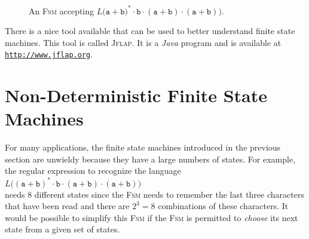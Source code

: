  \begin{figure}[!ht]
   \centering
    \caption{An \textsc{Fsm} accepting
             $L\bigl(\texttt{a}+\texttt{b})^* \cdot \texttt{b} \cdot (\texttt{a}+\texttt{b}) \cdot (\texttt{a}+\texttt{b})\bigr)$.}
   \label{fig:abstarbabab.dot}
 \end{figure}

\remark
There is a nice tool available that can be used to better understand finite state machines.  This
tool is called \textsc{Jflap}.  It is a \textsl{Java} program and is available at
\\[0.2cm]
\hspace*{1.3cm}
\href{http://www.jflap.org}{\texttt{http://www.jflap.org}}.


\section{Non-Deterministic Finite State Machines}
For many applications, the finite state machines introduced in the previous section are unwieldy
because they have a large numbers of states.  For example, the regular expression to recognize the language
\\[0.2cm]
\hspace*{1.3cm}
$L\bigl((\texttt{a}+\texttt{b})^* \cdot \texttt{b} \cdot (\texttt{a}+\texttt{b}) \cdot (\texttt{a}+\texttt{b})\bigr)$ 
\\[0.2cm]
needs 8 different states since the \textsc{Fsm} needs to remember the last three characters that
have been read and there are $2^3 = 8$ combinations of these characters. 
It would be possible to simplify this \textsc{Fsm} if the \textsc{Fsm} is permitted to \emph{choose} its
next state from a given set of states.

